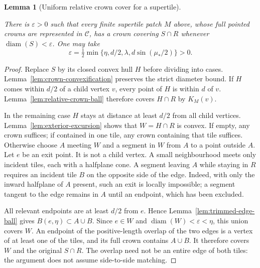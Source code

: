 \documentclass[11pt,a4paper]{article}
\newtheorem{lemma}[definition]{Lemma}
\theoremstyle{remark}
\newcommand{\lean}[1]{}
\newcommand{\uses}[1]{}
\begin{document}
\begin{lemma}[Uniform relative crown cover for a supertile]
\label{lem:crown-cover-supertile}
\lean{Tilings.Crowns.uniformCrownCoverSupertile}
\uses{def:substitution,def:crown,def:flc,def:crown-sector,def:macro-boundary,lem:relative-crown-ball,lem:trimmed-edge-ball,lem:exterior-excursion,lem:crown-convexification}
There is $\varepsilon>0$ such that every finite supertile patch $M$ above,
whose full pointed crowns are represented in $\mathcal C$, has a crown
covering $S\cap R$ whenever $\operatorname{diam}(S)<\varepsilon$.
One may take
\[
 \varepsilon=\tfrac12\min
   \{\eta,d/2,\lambda,d\sin(\mu_*/2)\}>0.
\]
\end{lemma}
\begin{proof}
Replace $S$ by its closed convex hull $H$ before dividing into cases.
Lemma~\ref{lem:crown-convexification} preserves the strict diameter
bound.  If $H$ comes within $d/2$ of a child vertex $v$, every point of
$H$ is within $d$ of $v$.  Lemma~\ref{lem:relative-crown-ball} therefore
covers $H\cap R$ by $K_M(v)$.

In the remaining case $H$ stays at distance at least $d/2$ from all child
vertices.  Lemma~\ref{lem:exterior-excursion} shows that $W=H\cap R$ is
convex.  If empty, any crown suffices; if contained in one tile, any crown
containing that tile suffices.  Otherwise choose $A$ meeting $W$ and a
segment in $W$ from $A$ to a point outside $A$.  Let $e$ be an exit point.
It is not a child vertex.  A small neighbourhood meets only incident
tiles, each with a halfplane cone.  A segment leaving $A$ while staying
in $R$ requires an incident tile $B$ on the opposite side of the edge.
Indeed, with only the inward halfplane of $A$ present, such an exit is
locally impossible; a segment tangent to the edge remains in $A$ until
an endpoint, which has been excluded.

All relevant endpoints are at least $d/2$ from $e$.  Hence
Lemma~\ref{lem:trimmed-edge-ball} gives $B(e,\eta)\subset A\cup B$.
Since $e\in W$ and $\operatorname{diam}(W)<\varepsilon<\eta$, this union
covers $W$.  An endpoint of the positive-length overlap of the two edges
is a vertex of at least one of the tiles, and its full crown contains
$A\cup B$.  It therefore covers $W$ and the original $S\cap R$.
The overlap need not be an entire edge of both tiles: the argument does
not assume side-to-side matching.
\end{proof}
\end{document}
